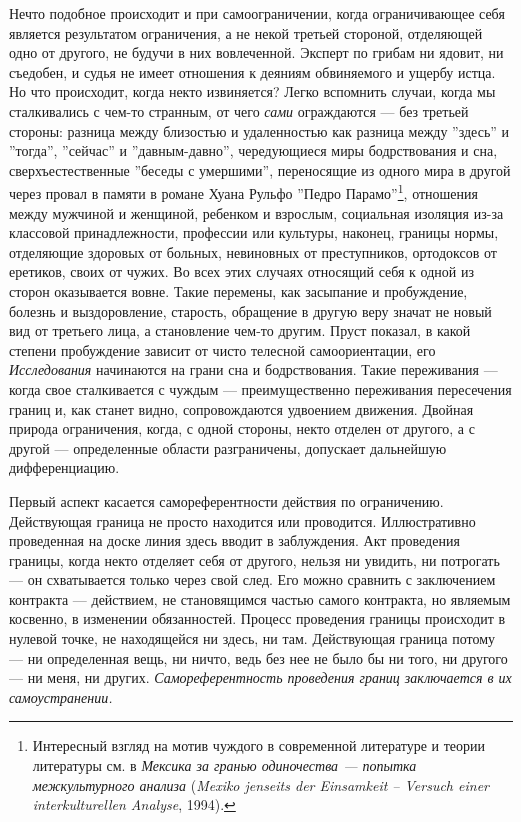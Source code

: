 \documentclass[12pt]{book}
\begin{document}
Нечто подобное происходит и при самоограничении, когда ограничивающее себя является результатом ограничения, а не некой третьей стороной, отделяющей одно от другого, не будучи в них вовлеченной. Эксперт по грибам ни ядовит, ни съедобен, и судья не имеет отношения к деяниям обвиняемого и ущербу истца. Но что происходит, когда некто извиняется? Легко вспомнить случаи, когда мы сталкивались с чем-то странным, от чего \textit{сами} ограждаются --- без третьей стороны: разница между близостью и удаленностью как разница между ''здесь'' и ''тогда'', ''сейчас'' и ''давным-давно'', чередующиеся миры бодрствования и сна, сверхъестественные ''беседы с умершими'', переносящие из одного мира в другой через провал в памяти в романе Хуана Рульфо ''Педро Парамо''\footnote{Интересный взгляд на мотив чуждого в современной литературе и теории литературы см. в \textit{Мексика за гранью одиночества --- попытка межкультурного анализа} (\textit{Mexiko jenseits der Einsamkeit -- Versuch einer interkulturellen Analyse}, 1994).}, отношения между мужчиной и женщиной, ребенком и взрослым, социальная изоляция из-за классовой принадлежности, профессии или культуры, наконец, границы нормы, отделяющие здоровых от больных, невиновных от преступников, ортодоксов от еретиков, своих от чужих. Во всех этих случаях относящий себя к одной из сторон оказывается вовне. Такие перемены, как засыпание и пробуждение, болезнь и выздоровление, старость, обращение в другую веру значат не новый вид от третьего лица, а становление чем-то другим. Пруст показал, в какой степени пробуждение зависит от чисто телесной самоориентации, его \textit{Исследования} начинаются на грани сна и бодрствования. Такие переживания --- когда свое сталкивается с чуждым --- преимущественно переживания пересечения границ и, как станет видно, сопровождаются удвоением движения. Двойная природа ограничения, когда, с одной стороны, некто отделен от другого, а с другой --- определенные области разграничены, допускает дальнейшую дифференциацию.

Первый аспект касается самореферентности действия по ограничению. Действующая граница не просто находится или проводится. Иллюстративно проведенная на доске линия здесь вводит в заблуждения. Акт проведения границы, когда некто отделяет себя от другого, нельзя ни увидить, ни потрогать --- он схватывается только через свой след. Его можно сравнить с заключением контракта --- действием, не становящимся частью самого контракта, но являемым косвенно, в изменении обязанностей. Процесс проведения границы происходит в нулевой точке, не находящейся ни здесь, ни там. Действующая граница потому --- ни определенная вещь, ни ничто, ведь без нее не было бы ни того, ни другого --- ни меня, ни других. \textit{Самореферентность проведения границ заключается в их самоустранении.}
\end{document}
